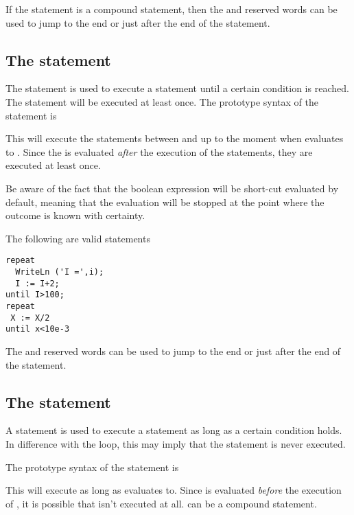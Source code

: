 If the statement is a compound statement, then the  and
 reserved words can be used to jump to the end or just
after the end of the  statement.

\subsection{The  statement}
The  statement is used to execute a statement until a certain
condition is reached. The statement will be executed at least once.
The prototype syntax of the  statement is

This will execute the statements between  and  up to
the moment when  evaluates to .
Since the  is evaluated {\em after} the execution of the
statements, they are executed at least once.

Be aware of the fact that the boolean expression  will be 
short-cut evaluated by default, meaning that the evaluation will be stopped 
at the point where the outcome is known with certainty.

The following are valid  statements
\begin{verbatim}
repeat
  WriteLn ('I =',i);
  I := I+2;
until I>100;
repeat
 X := X/2
until x<10e-3
\end{verbatim}
The  and  reserved words can be used to jump to
the end or just after the end of the  statement.

\subsection{The  statement}
A  statement is used to execute a statement as long as a certain
condition holds. In difference with the  loop, this may imply 
that the statement is never executed.

The prototype syntax of the  statement is

This will execute  as long as  evaluates
to. Since  is evaluated {\em before} the execution
of , it is possible that  isn't executed at
all.  can be a compound statement.

